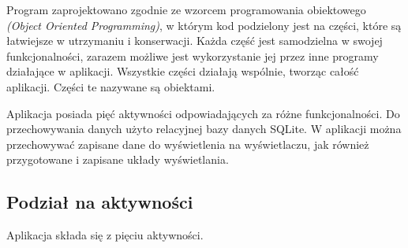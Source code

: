 \documentclass[a4paper,12pt, twoside]{article}
\begin{document}
    	Program zaprojektowano zgodnie ze wzorcem programowania obiektowego \textit{(Object Oriented Programming)}\cite{oop}, w którym kod podzielony jest na części, które są łatwiejsze w utrzymaniu i konserwacji. Każda część jest samodzielna w swojej funkcjonalności, zarazem możliwe jest wykorzystanie jej przez inne programy działające w aplikacji. Wszystkie części działają wspólnie, tworząc całość aplikacji. Części te nazywane są obiektami. 
    	
    	Aplikacja posiada pięć aktywności odpowiadających za różne funkcjonalności. Do przechowywania danych użyto relacyjnej bazy danych SQLite. W aplikacji można przechowywać zapisane dane do wyświetlenia na wyświetlaczu, jak również przygotowane i zapisane układy wyświetlania.
    	\newpage
    	\subsection{Podział na aktywności}
    	\label{podzialnaaktywnosci}
    	Aplikacja składa się z pięciu aktywności.
\end{document}

